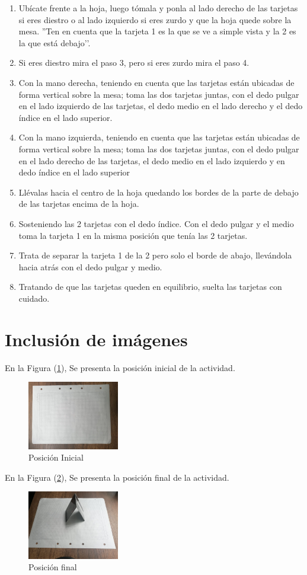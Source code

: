 \documentclass{article}
\begin{document}
\begin{enumerate}[1.]

    \item Ubícate frente a la hoja, luego tómala y ponla al lado derecho de las             tarjetas si eres diestro o al lado izquierdo si eres zurdo y que la hoja          quede sobre la mesa. ''Ten en cuenta que la tarjeta 1 es la que se ve a           simple vista y la 2 es la que está debajo’'.
    \item Si eres diestro mira el paso 3, pero si eres zurdo mira el paso 4.
    \item Con la mano derecha, teniendo en cuenta que las tarjetas están ubicadas de        forma vertical sobre la mesa; toma las dos tarjetas juntas, con el dedo           pulgar en el lado izquierdo de las tarjetas, el dedo medio en el lado             derecho y el dedo índice en el lado superior.
    \item Con la mano izquierda, teniendo en cuenta que las tarjetas están ubicadas de       forma vertical sobre la mesa; toma las dos tarjetas juntas, con el dedo            pulgar en el lado derecho de las tarjetas, el dedo medio en el lado               izquierdo
         y en dedo índice en el lado superior
    \item Llévalas hacia el centro de la hoja quedando los bordes de la parte de            debajo de las tarjetas encima de la hoja.
    \item Sosteniendo las 2 tarjetas con el dedo índice. Con el dedo pulgar y el medio       toma la tarjeta 1 en la misma posición que tenía las 2 tarjetas.
    \item Trata de separar la tarjeta 1 de la 2 pero solo el borde de abajo,                llevándola hacia atrás con el dedo pulgar y medio. 
    \item Tratando de que las tarjetas queden en equilibrio, suelta las tarjetas con        cuidado.
\end{enumerate}


\section{Inclusión de imágenes} \label{imagenes}

En la Figura (\ref{fig:posicion1}), Se presenta la posición inicial de la actividad.

\begin{figure}[h]
\includegraphics[width=4cm]{Posicion1.jpeg}
\centering
\caption{Posición Inicial}
\label{fig:posicion1}
\end{figure}


En la Figura (\ref{fig:posicion2}), Se presenta la posición final de la actividad.

\begin{figure}[h]
\includegraphics[width=4cm]{Posicion2.jpeg}
\centering
\caption{Posición final}
\label{fig:posicion2}
\end{figure}
\end{document}
